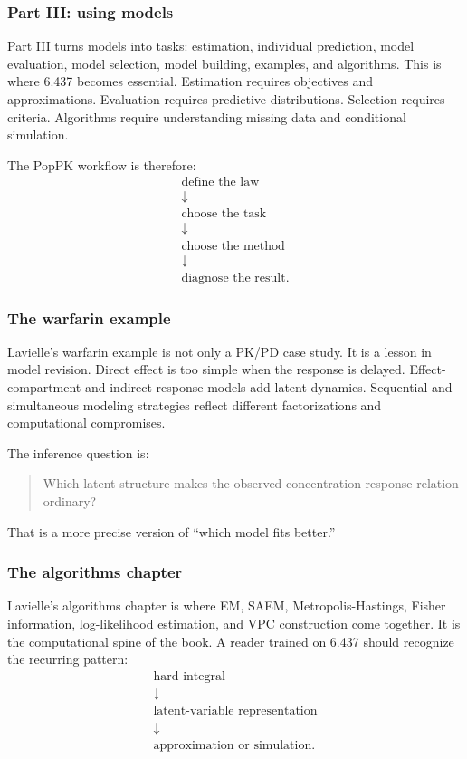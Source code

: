 \subsubsection*{Part III: using models}

Part III turns models into tasks: estimation, individual prediction, model evaluation, model selection, model building, examples, and algorithms.  This is where 6.437 becomes essential.  Estimation requires objectives and approximations.  Evaluation requires predictive distributions.  Selection requires criteria.  Algorithms require understanding missing data and conditional simulation.

The PopPK workflow is therefore:
\[
  \begin{array}{c}
    \text{define the law}\\
    \downarrow\\
    \text{choose the task}\\
    \downarrow\\
    \text{choose the method}\\
    \downarrow\\
    \text{diagnose the result}.
  \end{array}
\]

\subsubsection*{The warfarin example}

Lavielle's warfarin example is not only a PK/PD case study.  It is a lesson in model revision.  Direct effect is too simple when the response is delayed.  Effect-compartment and indirect-response models add latent dynamics.  Sequential and simultaneous modeling strategies reflect different factorizations and computational compromises.

The inference question is:
\begin{quote}
  Which latent structure makes the observed concentration-response relation ordinary?
\end{quote}
That is a more precise version of ``which model fits better.''

\subsubsection*{The algorithms chapter}

Lavielle's algorithms chapter is where EM, SAEM, Metropolis-Hastings, Fisher information, log-likelihood estimation, and VPC construction come together.  It is the computational spine of the book.  A reader trained on 6.437 should recognize the recurring pattern:
\[
  \begin{array}{c}
    \text{hard integral}\\
    \downarrow\\
    \text{latent-variable representation}\\
    \downarrow\\
    \text{approximation or simulation}.
  \end{array}
\]

